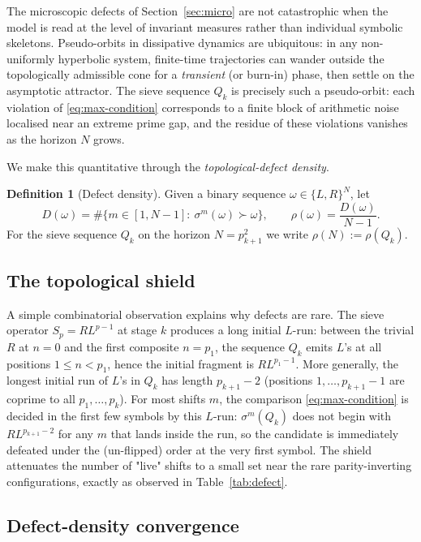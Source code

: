 \documentclass[11pt,a4paper]{article}
\theoremstyle{definition}
\newtheorem{definition}{Definition}
\begin{document}
The microscopic defects of Section~\ref{sec:micro} are not catastrophic
when the model is read at the level of invariant measures rather than
individual symbolic skeletons. Pseudo-orbits in dissipative dynamics are
ubiquitous: in any non-uniformly hyperbolic system, finite-time
trajectories can wander outside the topologically admissible cone for a
\emph{transient} (or burn-in) phase, then settle on the asymptotic
attractor. The sieve sequence $Q_k$ is precisely such a pseudo-orbit:
each violation of \eqref{eq:max-condition} corresponds to a finite block
of arithmetic noise localised near an extreme prime gap, and the residue
of these violations vanishes as the horizon $N$ grows.

We make this quantitative through the \emph{topological-defect density}.

\begin{definition}[Defect density]
Given a binary sequence $\omega \in \{L, R\}^N$, let
\[
    D(\omega) = \#\{m \in [1, N - 1] :\ \sigma^m(\omega) \succ \omega \},
\qquad
    \rho(\omega) = \frac{D(\omega)}{N - 1}.
\]
For the sieve sequence $Q_k$ on the horizon $N = p_{k+1}^2$ we write
$\rho(N) := \rho(Q_k)$.
\end{definition}

\subsection{The topological shield}

A simple combinatorial observation explains why defects are rare. The
sieve operator $S_p = R L^{p-1}$ at stage $k$ produces a long initial
$L$-run: between the trivial $R$ at $n = 0$ and the first composite
$n = p_1$, the sequence $Q_k$ emits $L$'s at all positions
$1 \leq n < p_1$, hence the initial fragment is $R L^{p_1 - 1}$. More
generally, the longest initial run of $L$'s in $Q_k$ has length
$p_{k+1} - 2$ (positions $1, \ldots, p_{k+1} - 1$ are coprime to all
$p_1, \ldots, p_k$). For most shifts $m$, the comparison
\eqref{eq:max-condition} is decided in the first few symbols by this
$L$-run: $\sigma^m(Q_k)$ does not begin with $R L^{p_{k+1} - 2}$ for any
$m$ that lands inside the run, so the candidate is immediately defeated
under the (un-flipped) order at the very first symbol. The shield
attenuates the number of "live" shifts to a small set near the rare
parity-inverting configurations, exactly as observed in
Table~\ref{tab:defect}.

\subsection{Defect-density convergence}
\end{document}
